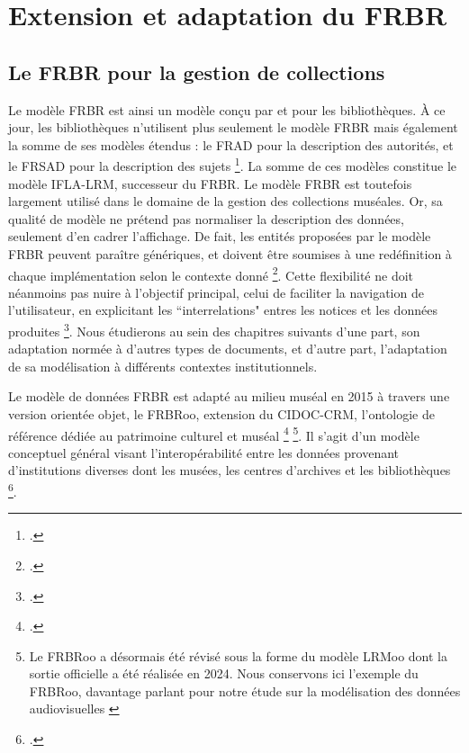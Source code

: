 \section{\label{I_1_B} Extension et adaptation du \gls{FRBR}}

\subsection{Le \gls{FRBR} pour la gestion de collections}
Le modèle \gls{FRBR} est ainsi un modèle conçu par et pour les bibliothèques. À ce jour, les bibliothèques n'utilisent plus seulement le modèle \gls{FRBR} mais également la somme de ses modèles étendus : le \gls{FRAD} pour la description des autorités, et le \gls{FRSAD} pour la description des sujets \footcite{zotero-item-651}. La somme de ces modèles constitue le modèle \gls{IFLA-LRM}, successeur du \gls{FRBR}. Le modèle \gls{FRBR} est toutefois largement utilisé dans le domaine de la gestion des collections muséales. Or, sa qualité de modèle ne prétend pas normaliser la description des données, seulement d’en cadrer l’affichage. De fait, les entités proposées par le modèle \gls{FRBR} peuvent paraître génériques, et doivent être soumises à une redéfinition à chaque implémentation selon le contexte donné \footcite{boeuf2008}. Cette flexibilité ne doit néanmoins pas nuire à l'objectif principal, celui de faciliter la navigation de l'utilisateur, en explicitant les “interrelations" entres les notices et les données produites \footcite{boeuf2008}. Nous étudierons au sein des chapitres suivants d'une part, son adaptation normée à d'autres types de documents, et d'autre part, l'adaptation de sa modélisation à différents contextes institutionnels. 

Le modèle de données \gls{FRBR} est adapté au milieu muséal en 2015 à travers une version orientée objet, le \gls{FRBRoo}, extension du \gls{CIDOC-CRM}, l'ontologie de référence dédiée au patrimoine culturel et muséal \footcite{gillis2015} \footnote{Le \gls{FRBRoo} a désormais été révisé sous la forme du modèle LRMoo dont la sortie officielle a été réalisée en 2024. Nous conservons ici l'exemple du \gls{FRBRoo}, davantage parlant pour notre étude sur la modélisation des données audiovisuelles \cite{zotero-item-813}}. Il s’agit d’un modèle conceptuel général visant l’interopérabilité entre les données provenant d’institutions diverses dont les musées, les centres d’archives et les bibliothèques \footcite{zotero-item-811}.  

